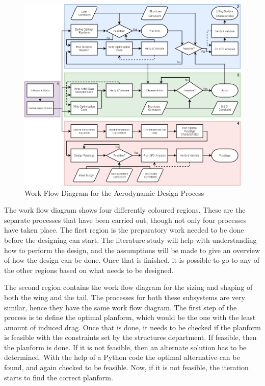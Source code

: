 \begin{figure}[hbt]
    \centering
    \includegraphics[scale=0.45]{Aerodynamics/Figures/AerodynamicWFD.png}
    \caption{Work Flow Diagram for the Aerodynamic Design Process}
    \label{fig:flow:aerodynamics}
\end{figure}

The work flow diagram shows four differently coloured regions. These are the separate processes that have been carried out, though not only four processes have taken place. The first region is the preparatory work needed to be done before the designing can start. The literature study will help with understanding how to perform the design, and the assumptions will be made to give an overview of how the design can be done. Once that is finished, it is possible to go to any of the other regions based on what needs to be designed.

The second region contains the work flow diagram for the sizing and shaping of both the wing and the tail. The processes for both these subsystems are very similar, hence they have the same work flow diagram. The first step of the process is to define the optimal planform, which would be the one with the least amount of induced drag. Once that is done, it needs to be checked if the planform is feasible with the constraints set by the structures department. If feasible, then the planform is done. If it is not feasible, then an alternate solution has to be determined. With the help of a Python code the optimal alternative can be found, and again checked to be feasible. Now, if it is not feasible, the iteration starts to find the correct planform.

